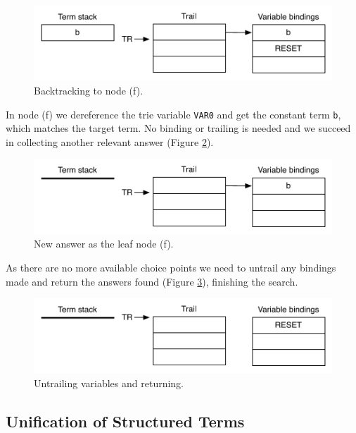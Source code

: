 \begin{figure}[H]
  \centering
    \includegraphics[scale=0.6]{collect_ex4.pdf}
  \caption{Backtracking to node (f).}
  \label{fig:collect_ex4}
\end{figure}

In node (f) we dereference the trie variable \texttt{VAR0} and get the constant term \texttt{b}, which matches the target term. No binding or trailing is needed and we succeed in collecting another relevant answer (Figure \ref{fig:collect_ex5}).

\begin{figure}[H]
  \centering
    \includegraphics[scale=0.6]{collect_ex5.pdf}
  \caption{New answer as the leaf node (f).}
  \label{fig:collect_ex5}
\end{figure}

As there are no more available choice points we need to untrail any bindings made and return
the answers found (Figure \ref{fig:collect_ex6}), finishing the search.

\begin{figure}[H]
  \centering
    \includegraphics[scale=0.6]{collect_ex6.pdf}
  \caption{Untrailing variables and returning.}
  \label{fig:collect_ex6}
\end{figure}

\subsection{Unification of Structured Terms}

